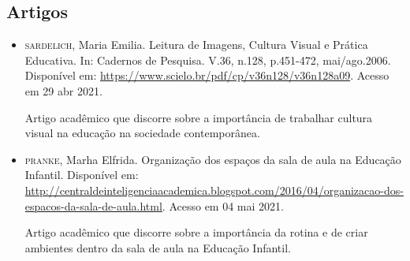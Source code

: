 \documentclass[11pt]{extarticle}
\begin{document}
\subsection{Artigos}

\begin{itemize}
\item \textsc{sardelich}, Maria Emilia. Leitura de Imagens, Cultura Visual e Prática Educativa. 
In: Cadernos de Pesquisa. V.36, n.128, p.451-472, mai/ago.2006. Disponível em: \url{https://www.scielo.br/pdf/cp/v36n128/v36n128a09}. 
Acesso em 29 abr 2021. 

Artigo acadêmico que discorre sobre a importância de trabalhar cultura 
visual na educação na sociedade contemporânea. 

\item \textsc{pranke}, Marha Elfrida. Organização dos espaços da sala de aula na Educação Infantil. Disponível em: \url{http://centraldeinteligenciaacademica.blogspot.com/2016/04/organizacao-dos-espacos-da-sala-de-aula.html}. Acesso em 04 mai 2021. 

Artigo acadêmico que discorre sobre a importância da rotina e de criar ambientes dentro da sala de aula na Educação Infantil.  
\end{itemize}

\end{document}
